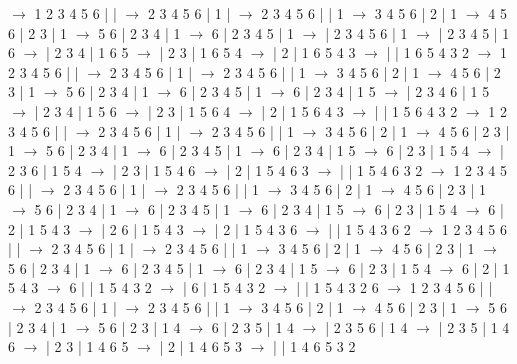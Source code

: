 \documentclass{article}
\begin{document}
\newline
 $\rightarrow$ 1 2 3 4 5 6 |  |  $\rightarrow$ 2 3 4 5 6 | 1 |  $\rightarrow$ 2 3 4 5 6 |  | 1 $\rightarrow$ 3 4 5 6 | 2 | 1 $\rightarrow$ 4 5 6 | 2 3 | 1 $\rightarrow$ 5 6 | 2 3 4 | 1 $\rightarrow$ 6 | 2 3 4 5 | 1 $\rightarrow$  | 2 3 4 5 6 | 1 $\rightarrow$  | 2 3 4 5 | 1 6 $\rightarrow$  | 2 3 4 | 1 6 5 $\rightarrow$  | 2 3 | 1 6 5 4 $\rightarrow$  | 2 | 1 6 5 4 3 $\rightarrow$  |  | 1 6 5 4 3 2
\newline
 $\rightarrow$ 1 2 3 4 5 6 |  |  $\rightarrow$ 2 3 4 5 6 | 1 |  $\rightarrow$ 2 3 4 5 6 |  | 1 $\rightarrow$ 3 4 5 6 | 2 | 1 $\rightarrow$ 4 5 6 | 2 3 | 1 $\rightarrow$ 5 6 | 2 3 4 | 1 $\rightarrow$ 6 | 2 3 4 5 | 1 $\rightarrow$ 6 | 2 3 4 | 1 5 $\rightarrow$  | 2 3 4 6 | 1 5 $\rightarrow$  | 2 3 4 | 1 5 6 $\rightarrow$  | 2 3 | 1 5 6 4 $\rightarrow$  | 2 | 1 5 6 4 3 $\rightarrow$  |  | 1 5 6 4 3 2
\newline
 $\rightarrow$ 1 2 3 4 5 6 |  |  $\rightarrow$ 2 3 4 5 6 | 1 |  $\rightarrow$ 2 3 4 5 6 |  | 1 $\rightarrow$ 3 4 5 6 | 2 | 1 $\rightarrow$ 4 5 6 | 2 3 | 1 $\rightarrow$ 5 6 | 2 3 4 | 1 $\rightarrow$ 6 | 2 3 4 5 | 1 $\rightarrow$ 6 | 2 3 4 | 1 5 $\rightarrow$ 6 | 2 3 | 1 5 4 $\rightarrow$  | 2 3 6 | 1 5 4 $\rightarrow$  | 2 3 | 1 5 4 6 $\rightarrow$  | 2 | 1 5 4 6 3 $\rightarrow$  |  | 1 5 4 6 3 2
\newline
 $\rightarrow$ 1 2 3 4 5 6 |  |  $\rightarrow$ 2 3 4 5 6 | 1 |  $\rightarrow$ 2 3 4 5 6 |  | 1 $\rightarrow$ 3 4 5 6 | 2 | 1 $\rightarrow$ 4 5 6 | 2 3 | 1 $\rightarrow$ 5 6 | 2 3 4 | 1 $\rightarrow$ 6 | 2 3 4 5 | 1 $\rightarrow$ 6 | 2 3 4 | 1 5 $\rightarrow$ 6 | 2 3 | 1 5 4 $\rightarrow$ 6 | 2 | 1 5 4 3 $\rightarrow$  | 2 6 | 1 5 4 3 $\rightarrow$  | 2 | 1 5 4 3 6 $\rightarrow$  |  | 1 5 4 3 6 2
\newline
 $\rightarrow$ 1 2 3 4 5 6 |  |  $\rightarrow$ 2 3 4 5 6 | 1 |  $\rightarrow$ 2 3 4 5 6 |  | 1 $\rightarrow$ 3 4 5 6 | 2 | 1 $\rightarrow$ 4 5 6 | 2 3 | 1 $\rightarrow$ 5 6 | 2 3 4 | 1 $\rightarrow$ 6 | 2 3 4 5 | 1 $\rightarrow$ 6 | 2 3 4 | 1 5 $\rightarrow$ 6 | 2 3 | 1 5 4 $\rightarrow$ 6 | 2 | 1 5 4 3 $\rightarrow$ 6 |  | 1 5 4 3 2 $\rightarrow$  | 6 | 1 5 4 3 2 $\rightarrow$  |  | 1 5 4 3 2 6
\newline
 $\rightarrow$ 1 2 3 4 5 6 |  |  $\rightarrow$ 2 3 4 5 6 | 1 |  $\rightarrow$ 2 3 4 5 6 |  | 1 $\rightarrow$ 3 4 5 6 | 2 | 1 $\rightarrow$ 4 5 6 | 2 3 | 1 $\rightarrow$ 5 6 | 2 3 4 | 1 $\rightarrow$ 5 6 | 2 3 | 1 4 $\rightarrow$ 6 | 2 3 5 | 1 4 $\rightarrow$  | 2 3 5 6 | 1 4 $\rightarrow$  | 2 3 5 | 1 4 6 $\rightarrow$  | 2 3 | 1 4 6 5 $\rightarrow$  | 2 | 1 4 6 5 3 $\rightarrow$  |  | 1 4 6 5 3 2
\end{document}
